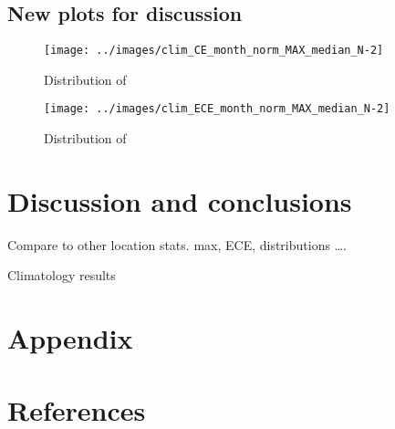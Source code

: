 \documentclass[
]{article}
\begin{document}
\FloatBarrier

\hypertarget{new-plots-for-discussion}{%
\subsection{New plots for discussion}\label{new-plots-for-discussion}}

\begin{figure}[h!]

{\centering \texttt{[image: ../images/clim\_CE\_month\_norm\_MAX\_median\_N-2]} 

}

\caption{Distribution of }\label{fig:unnamed-chunk-12}
\end{figure}

\begin{figure}[h!]

{\centering \texttt{[image: ../images/clim\_ECE\_month\_norm\_MAX\_median\_N-2]} 

}

\caption{Distribution of }\label{fig:unnamed-chunk-13}
\end{figure}

\FloatBarrier

\hypertarget{discussion-and-conclusions}{%
\section{Discussion and conclusions}\label{discussion-and-conclusions}}

Compare to other location stats.
max, ECE, distributions \ldots.

Climatology results

\hypertarget{appendix}{%
\section*{Appendix}\label{appendix}}

\hypertarget{references}{%
\section*{References}\label{references}}
\end{document}
